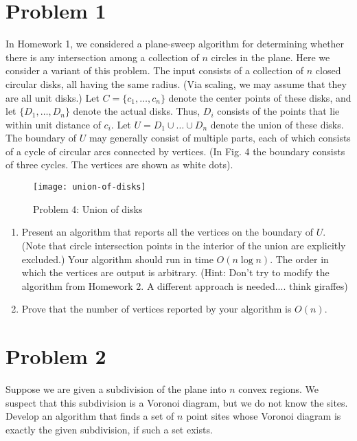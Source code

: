\documentclass[11pt]{article}
\begin{document}

\newpage
\section*{Problem 1}

In Homework 1, we considered a plane-sweep algorithm for determining whether
there is any intersection among a collection of $n$ circles in the plane. Here
we consider a variant of this problem. The input consists of a collection of $n$
closed circular disks, all having the same radius. (Via scaling, we may assume
that they are all unit disks.) Let $C = \{c_1, \ldots , c_n\}$ denote the center
points of these disks, and let $\{D_1, \ldots, D_n\}$ denote the actual disks.
Thus, $D_i$ consists of the points that lie within unit distance of $c_i$. Let
$U = D_1 \cup \ldots \cup D_n$ denote the union of these disks. The boundary of
$U$ may generally consist of multiple parts, each of which consists of a cycle
of circular arcs connected by vertices. (In Fig. 4 the boundary consists of
three cycles. The vertices are shown as white dots).

\begin{figure}[h]
    \centering
    \texttt{[image: union-of-disks]}
    \caption{Problem 4: Union of disks}
\end{figure}


\begin{enumerate}

    \item Present an algorithm that reports all the vertices on the boundary of
        $U$. (Note that circle intersection points in the interior of the union
        are explicitly excluded.) Your algorithm should run in time $O(n \log
        n)$.  The order in which the vertices are output is arbitrary. (Hint:
        Don't try to modify the algorithm from Homework 2. A different approach
        is needed.... think giraffes)

    \item Prove that the number of vertices reported by your algorithm is
        $O(n)$.

\end{enumerate}

\newpage
\section*{Problem 2}

Suppose we are given a subdivision of the plane into $n$ convex regions. We
suspect that this subdivision is a Voronoi diagram, but we do not know the
sites. Develop an algorithm that finds a set of $n$ point sites whose Voronoi
diagram is exactly the given subdivision, if such a set exists. \\\\
\end{document}
